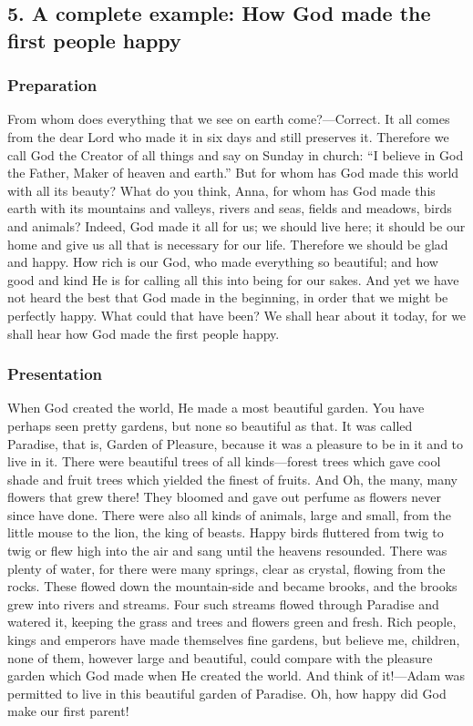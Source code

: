 \subsection[5. A complete example]{5. A complete example: How God made the first people happy}

\subsubsection{Preparation} From whom does everything that we see on earth come?—Correct. It all comes from the dear Lord who made it in six days and still preserves it. Therefore we call God the Creator of all
things and say on Sunday in church: “I believe in God the Father, Maker of heaven and earth.” But for whom has God made this world with all its beauty? What do you think, Anna, for whom has God made this earth with its mountains and valleys, rivers and seas, fields and meadows, birds and animals? Indeed, God made it all for us; we should live here; it should be our home and give us all that is necessary for our life. Therefore we should be glad and happy. How rich is our God, who made everything so beautiful; and how good and kind He is for calling all this into being for our sakes. And yet we have not heard the best that God made in the beginning, in order that we might be perfectly happy. What could that have been? We shall hear about it today, for we shall hear how God made the first people happy.

\subsubsection{Presentation} When God created the world, He made a most beautiful garden. You have perhaps seen pretty gardens, but none so beautiful as that. It was called Paradise, that is, Garden of Pleasure, because it was a pleasure to be in it and to live in it. There were beautiful trees of all kinds—forest trees which gave cool shade and fruit trees which yielded the finest of fruits. And Oh, the many, many flowers that grew there! They bloomed and gave out perfume as flowers never since have done. There were also all kinds of animals, large and small, from the little mouse to the lion, the king of beasts. Happy birds fluttered from twig to twig or flew high into the air and sang until the heavens resounded. There was plenty of water, for there were many springs, clear as crystal, flowing from the rocks. These flowed down the mountain-side and became brooks, and the brooks grew into rivers and streams. Four such streams flowed through Paradise and watered it, keeping the grass and trees and flowers green and fresh. Rich people, kings and emperors have made themselves fine gardens, but believe me, children, none of them, however large and beautiful, could compare with the pleasure garden which God made when He created the world. And think of it!—Adam was permitted to live in this beautiful garden of Paradise. Oh, how happy did God make our first parent!


